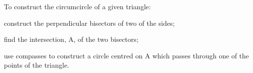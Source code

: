 To construct the circumcircle of a given triangle:
\par
construct the perpendicular bisectors of two of the sides;
\par
find the intersection, A, of the two bisectors;
\par
use compasses to construct a circle centred on A which 
passes through one of the points of the triangle.